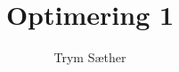 \documentclass[10pt, a4paper]{report}
\begin{document}
\title{Optimering 1}

\author{Trym Sæther}

\maketitle

\tableofcontents

\newpage





\clearpage
\appendix



\end{document}
